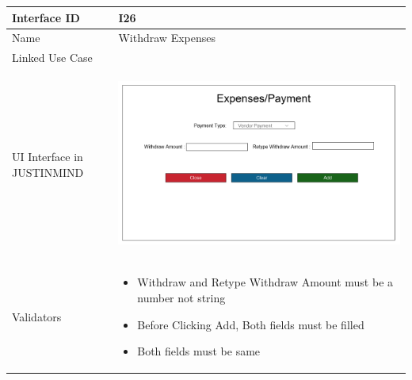 \documentclass[12pt,a4paper]{report}
\begin{document}
\begin{tabular}{ | m{3cm} | m{12cm}| } \hline

Interface ID & I26  \\\hline

Name  & Withdraw Expenses  \\ \hline

Linked Use Case &  \\ \hline

UI Interface in JUSTINMIND & \begin{center} \includegraphics[scale=0.3]{./UIs for Latex Reports/UI-027 Add Withdraw Expenses@1x.png}\end{center}  \\ \hline

Validators & 
\begin{itemize}
\item   Withdraw and Retype Withdraw Amount must be a number not string
\item  Before Clicking Add, Both fields must be filled
\item  Both fields must be same


\end{itemize}
\\ \hline

\end{tabular} 
\newpage
\end{document}

